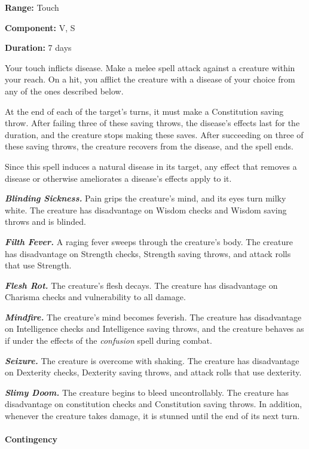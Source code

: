 \documentclass[
]{article}
\begin{document}
\textbf{Range:} Touch

\textbf{Component:} V, S

\textbf{Duration:} 7 days

Your touch inflicts disease. Make a melee spell attack against a
creature within your reach. On a hit, you afflict the creature with a
disease of your choice from any of the ones described below.

At the end of each of the target's turns, it must make a Constitution
saving throw. After failing three of these saving throws, the disease's
effects last for the duration, and the creature stops making these
saves. After succeeding on three of these saving throws, the creature
recovers from the disease, and the spell ends.

Since this spell induces a natural disease in its target, any effect
that removes a disease or otherwise ameliorates a disease's effects
apply to it.

\emph{\textbf{Blinding Sickness.}} Pain grips the creature's mind, and
its eyes turn milky white. The creature has disadvantage on Wisdom
checks and Wisdom saving throws and is blinded.

\emph{\textbf{Filth Fever.}} A raging fever sweeps through the
creature's body. The creature has disadvantage on Strength checks,
Strength saving throws, and attack rolls that use Strength.

\emph{\textbf{Flesh Rot.}} The creature's flesh decays. The creature has
disadvantage on Charisma checks and vulnerability to all damage.

\emph{\textbf{Mindfire.}} The creature's mind becomes feverish. The
creature has disadvantage on Intelligence checks and Intelligence saving
throws, and the creature behaves as if under the effects of the
\emph{confusion} spell during combat.

\emph{\textbf{Seizure.}} The creature is overcome with shaking. The
creature has disadvantage on Dexterity checks, Dexterity saving throws,
and attack rolls that use dexterity.

\emph{\textbf{Slimy Doom.}} The creature begins to bleed uncontrollably.
The creature has disadvantage on constitution checks and Constitution
saving throws. In addition, whenever the creature takes damage, it is
stunned until the end of its next turn.

\hypertarget{contingency}{%
\paragraph{Contingency}\label{contingency}}
\end{document}
